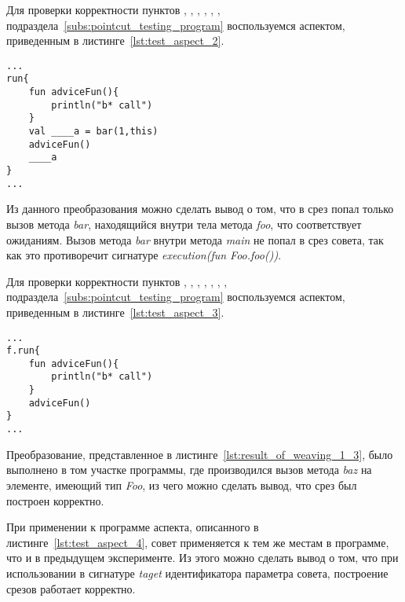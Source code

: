 Для проверки корректности пунктов
 \quotes{\ref{list:method_name_check}},
 \quotes{\ref{list:class_name_check}},
 \quotes{\ref{list:method_modifiers_check}},
 \quotes{\ref{list:method_return_value_check}},
 \quotes{\ref{list:execution_check}},
 \quotes{\ref{list:reference_pointcut_check}},
 \quotes{\ref{list:logic_operations_check}} подраздела~\ref{subs:pointcut_testing_program} воспользуемся аспектом, приведенным в листинге~\ref{lst:test_aspect_2}.
 \begin{lstlisting}[style={java}, label={lst:result_of_weaving_1_2},
 caption={Результат применения аспекта, описанного в листинге~\ref{lst:test_aspect_2}, к тестовой программе}]
...
run{
	fun adviceFun(){
        println("b* call")
    }
	val ____a = bar(1,this)
	adviceFun()
	____a
}
...
\end{lstlisting}
Из данного преобразования можно сделать вывод о том, что в срез попал только вызов метода \textit{bar}, находящийся внутри тела метода \textit{foo}, что соответствует ожиданиям.
Вызов метода \textit{bar} внутри метода \textit{main} не попал в срез совета, так как это противоречит сигнатуре \textit{execution(fun Foo.foo())}.

Для проверки корректности пунктов \quotes{\ref{list:method_name_check}},
\quotes{\ref{list:class_name_check}},
\quotes{\ref{list:method_params_check}},
\quotes{\ref{list:method_modifiers_check}},
\quotes{\ref{list:method_extension_check}},
\quotes{\ref{list:method_return_value_check}},
\quotes{\ref{list:target_check}},
\quotes{\ref{list:logic_operations_check}} подраздела~\ref{subs:pointcut_testing_program} воспользуемся аспектом, приведенным в листинге~\ref{lst:test_aspect_3}.
\begin{lstlisting}[style={java}, label={lst:result_of_weaving_1_3},
 caption={Результат применения аспекта, описанного в листинге~\ref{lst:test_aspect_3}, к тестовой программе}]
...
f.run{
	fun adviceFun(){
        println("b* call")
    }
	adviceFun()
}
...
\end{lstlisting}
Преобразование, представленное в листинге~\ref{lst:result_of_weaving_1_3}, было выполнено в том участке программы, где производился вызов метода \textit{baz} на элементе, имеющий тип \textit{Foo}, из чего можно сделать вывод, что срез был построен корректно.

При применении к программе аспекта, описанного в листинге~\ref{lst:test_aspect_4}, совет применяется к тем же местам в программе, что и в предыдущем эксперименте.
Из этого можно сделать вывод о том, что при использовании в сигнатуре \textit{taget} идентификатора параметра совета, построение срезов работает корректно.

